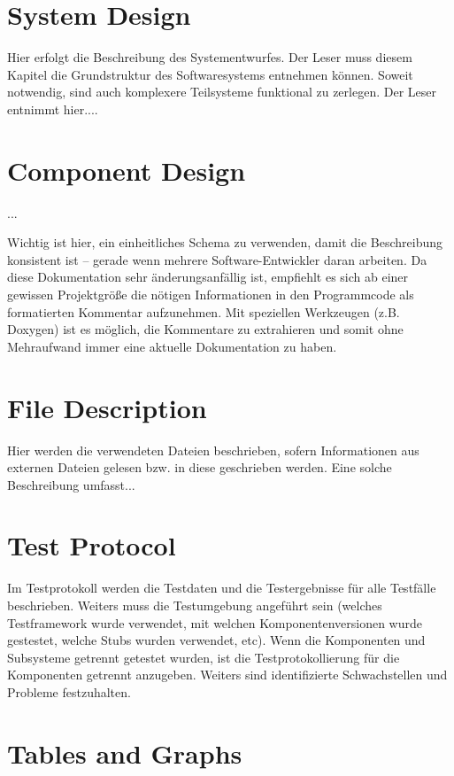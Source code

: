 \section{System Design}

Hier erfolgt die Beschreibung des Systementwurfes. Der Leser muss diesem Kapitel
die Grundstruktur des Softwaresystems entnehmen können. Soweit notwendig, sind
auch komplexere Teilsysteme funktional zu zerlegen.
Der Leser entnimmt hier....


\section{Component Design}

...

Wichtig ist hier, ein einheitliches Schema zu verwenden, damit die Beschreibung konsistent ist – gerade wenn mehrere Software-Entwickler daran arbeiten.
Da diese Dokumentation sehr änderungsanfällig ist, empfiehlt es sich ab einer gewissen Projektgröße die nötigen Informationen in den Programmcode als formatierten
Kommentar aufzunehmen. Mit speziellen Werkzeugen (z.B. Doxygen) ist es möglich,
die Kommentare zu extrahieren und somit ohne Mehraufwand immer eine aktuelle
Dokumentation zu haben.


\section{File Description}

Hier werden die verwendeten Dateien beschrieben, sofern Informationen aus externen
Dateien gelesen bzw. in diese geschrieben werden. Eine solche Beschreibung umfasst...

\section{Test Protocol}

Im Testprotokoll werden die Testdaten und die Testergebnisse für alle Testfälle beschrieben. Weiters muss die Testumgebung angeführt sein (welches Testframework
wurde verwendet, mit welchen Komponentenversionen wurde gestestet, welche Stubs
wurden verwendet, etc). Wenn die Komponenten und Subsysteme getrennt getestet
wurden, ist die Testprotokollierung für die Komponenten getrennt anzugeben. Weiters sind identifizierte Schwachstellen und Probleme festzuhalten.

\section{Tables and Graphs}

